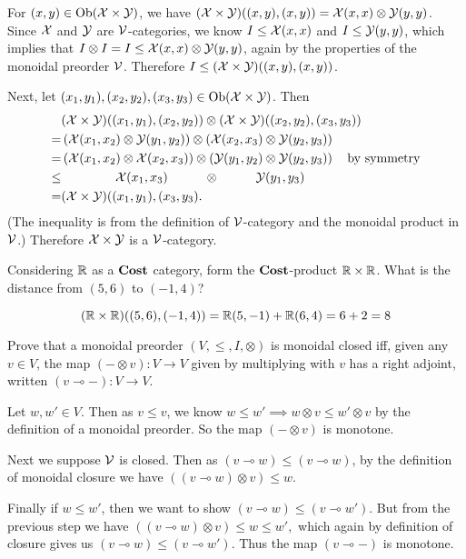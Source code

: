 For $(x,y)\in\textrm{Ob}(\mathcal{X}\times\mathcal{Y})$,  we have $(\mathcal{X}\times\mathcal{Y})((x,y),(x,y))=\mathcal{X}(x,x)\otimes\mathcal{Y}(y,y)$.  Since $\mathcal{X}$ and $\mathcal{Y}$ are $\mathcal{V}$-categories, we know $I\leq\mathcal{X}(x,x)$ and $I\leq\mathcal{Y}(y,y)$, which implies that $I\otimes I=I\leq\mathcal{X}(x,x)\otimes\mathcal{Y}(y,y)$, again by the properties of the monoidal preorder $\mathcal{V}$.  Therefore $I\leq(\mathcal{X}\times\mathcal{Y})((x,y),(x,y))$.

Next, let $(x_1,y_1),(x_2,y_2),(x_3,y_3)\in\textrm{Ob}(\mathcal{X}\times\mathcal{Y})$.  Then
\begin{align*}
	&(\mathcal{X}\times\mathcal{Y})((x_1,y_1),(x_2,y_2))\otimes(\mathcal{X}\times\mathcal{Y})((x_2,y_2),(x_3,y_3))\\ 
	=&\left(\mathcal{X}(x_1,x_2)\otimes\mathcal{Y}(y_1,y_2)\right)\otimes\left(\mathcal{X}(x_2,x_3)\otimes\mathcal{Y}(y_2,y_3)\right)\\
	=&\left(\mathcal{X}(x_1,x_2)\otimes\mathcal{X}(x_2,x_3)\right)\otimes\left(\mathcal{Y}(y_1,y_2)\otimes\mathcal{Y}(y_2,y_3)\right)\quad\textrm{by symmetry}\\
	\leq&\hspace{1.5cm}\mathcal{X}(x_1,x_3)\hspace{1cm}\otimes\hspace{1cm}\mathcal{Y}(y_1,y_3)\\
	=&(\mathcal{X}\times\mathcal{Y})((x_1,y_1),(x_3,y_3).
\end{align*}
(The inequality is from the definition of $\mathcal{V}$-category and the monoidal product in $\mathcal{V}$.)
Therefore $\mathcal{X}\times\mathcal{Y}$ is a $\mathcal{V}$-category.

Considering $\mathbb{R}$ as a $\textbf{Cost}$ category, form the $\textbf{Cost}$-product $\mathbb{R}\times\mathbb{R}$.  What is the distance from $(5,6)$ to $(-1,4)$?

\solution
$$(\mathbb{R}\times\mathbb{R})((5,6),(-1,4)) = \mathbb{R}(5,-1)+\mathbb{R}(6,4)=6+2=8$$

Prove that a monoidal preorder $(V,\leq, I,\otimes)$ is monoidal closed iff, given any $v\in V$, the map $(-\otimes v):V\to V$ given by multiplying with $v$ has a right adjoint, written $(v \multimap-): V \to V$.

\solution
Let $w,w'\in V$.  Then as $v\leq v$, we know $w\leq w'\implies w\otimes v\leq w'\otimes v$ by the definition of a monoidal preorder.  So the map $(-\otimes v)$ is monotone.

Next we suppose $\mathcal{V}$ is closed.  Then as $(v\multimap w)\leq (v\multimap w)$, by the definition of monoidal closure we have $\left((v\multimap w)\otimes v\right) \leq w$.

Finally if $w\leq w'$, then we want to show $(v\multimap w)\leq (v\multimap w')$.  But from the previous step we have $\left((v\multimap w)\otimes v\right)\leq w\leq w',$ which again by definition of closure gives us $(v\multimap w)\leq (v\multimap w')$.  Thus the map $(v \multimap-)$ is monotone.

